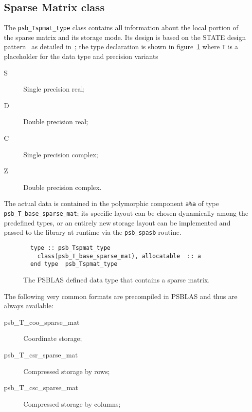 \subsection{Sparse Matrix class}
\label{sec:spmat}
The \hypertarget{spdata}{{\tt psb\_Tspmat\_type}} class
contains all information about the local portion of the sparse matrix and   
its storage mode. Its design is 
based on the STATE design pattern~\cite{DesignPatterns} as detailed
in~\cite{Sparse03}; the type declaration is shown in
figure~\ref{fig:spmattype} where \verb|T| is a placeholder for the
data type and precision variants 
\begin{description}
\item[S] Single precision real;
\item[D] Double precision real;
\item[C] Single precision complex;
\item[Z] Double precision complex.
\end{description}
The actual data is contained in the polymorphic component \verb|a%a|
of type  \hypertarget{spbasedata}{{\tt psb\_T\_base\_sparse\_mat}}; its
specific layout can be chosen dynamically among the predefined types,
or an entirely new storage layout can be implemented and passed to the
library at runtime via the \verb|psb_spasb| routine. 
\begin{figure}[h!]
\begin{center}
    \begin{minipage}[tl]{0.85\textwidth}
\begin{verbatim}
  type :: psb_Tspmat_type
    class(psb_T_base_sparse_mat), allocatable  :: a 
  end type  psb_Tspmat_type
\end{verbatim}
    \end{minipage}
  \end{center}
  \caption{\label{fig:spmattype} 
    The PSBLAS defined data type that
    contains a sparse matrix.} 
\end{figure}
The following very common formats are precompiled in  PSBLAS and thus
are always available: 
\begin{description}
\item[psb\_T\_coo\_sparse\_mat] Coordinate storage; 
\item[psb\_T\_csr\_sparse\_mat] Compressed storage by rows; 
\item[psb\_T\_csc\_sparse\_mat] Compressed storage by columns; 
\end{description}
